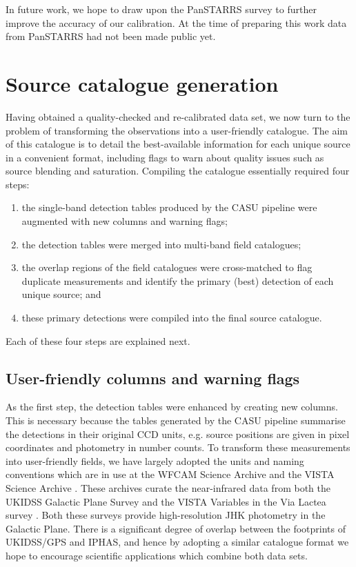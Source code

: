 \documentclass[useAMS,usenatbib]{mn2e}
\begin{document}
In future work, we hope to draw upon
the PanSTARRS survey \citep{Schlafly2012}
to further improve the accuracy of our calibration.
At the time of preparing this work data from PanSTARRS
had not been made public yet.

\section{Source catalogue generation}
\label{sec:catalogue}

Having obtained a quality-checked 
and re-calibrated data set, 
we now turn to the problem
of transforming the observations 
into a user-friendly catalogue.
The aim of this catalogue is to detail
the best-available information for each unique source
in a convenient format,
including flags to warn about quality issues 
such as source blending and saturation.
Compiling the catalogue essentially required four steps:
\begin{enumerate}
\item the single-band detection tables 
produced by the CASU pipeline 
were augmented with new columns
and warning flags;
\item the detection tables were merged into multi-band field catalogues;
\item the overlap regions of the field catalogues 
were cross-matched to flag duplicate measurements 
and identify the primary (best) detection 
of each unique source; and
\item these primary detections
were compiled into the final source catalogue.
\end{enumerate}
Each of these four steps are explained next.

\subsection{User-friendly columns and warning flags}

As the first step, the detection tables 
were enhanced by creating new columns.
This is necessary because the tables 
generated by the CASU pipeline 
summarise the detections 
in their original CCD units,
e.g. source positions are given in pixel coordinates 
and photometry in number counts.
To transform these measurements into
user-friendly fields,
we have largely adopted the units and naming conventions
which are in use at the 
WFCAM Science Archive \citep[WSA;][]{Hambly2008}
and the VISTA Science Archive \citep[VSA;][]{Cross2012}.
These archives curate the near-infrared data from both
the UKIDSS Galactic Plane Survey \citep[GPS;][]{Lucas2008}
and the 
VISTA Variables in the Via Lactea survey \cite[VVV;][]{Minniti2010}.
Both these surveys provide high-resolution JHK photometry
in the Galactic Plane.
There is a significant degree of overlap
between the footprints of UKIDSS/GPS and IPHAS,
and hence by adopting a similar catalogue format
we hope to encourage scientific applications
which combine both data sets.
\end{document}
